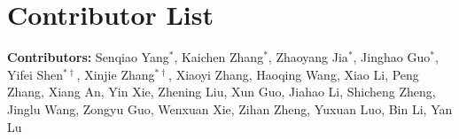 \section*{Contributor List}
\label{sec:contributor}

\noindent\textbf{Contributors:} Senqiao Yang$^{*}$, Kaichen Zhang$^{*}$, Zhaoyang Jia$^{*}$, Jinghao Guo$^{*}$, Yifei Shen$^{*\dagger}$, Xinjie Zhang$^{*\dagger}$, Xiaoyi Zhang, Haoqing Wang, Xiao Li, Peng Zhang, Xiang An, Yin Xie, Zhening Liu, Xun Guo, Jiahao Li, Shicheng Zheng, Jinglu Wang, Zongyu Guo, Wenxuan Xie, Zihan Zheng, Yuxuan Luo, Bin Li, Yan Lu

\vspace{0.5em}


